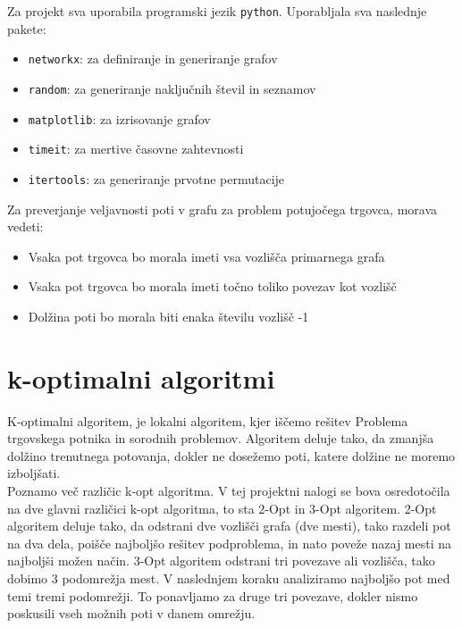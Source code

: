 \documentclass[12pt, a4paper]{article}
\begin{document}
Za projekt sva uporabila programski jezik \texttt{python}. Uporabljala sva naslednje pakete:

\begin{itemize}

\item \texttt{networkx}: za definiranje in generiranje grafov

\item \texttt{random}: za generiranje naključnih števil in seznamov

\item \texttt{matplotlib}: za izrisovanje grafov

\item \texttt{timeit}: za mertive časovne zahtevnosti

\item \texttt{itertools}: za generiranje prvotne permutacije

\end{itemize}

Za preverjanje veljavnosti poti v grafu za problem potujočega trgovca, morava vedeti:

\begin{itemize}

\item Vsaka pot trgovca bo morala imeti vsa vozlišča primarnega grafa
\item Vsaka pot trgovca bo morala imeti točno toliko povezav kot vozlišč
\item Dolžina poti bo morala biti enaka številu vozlišč -1

\end{itemize}

\newpage
\section[k-optimalni algoritmi]{k-optimalni algoritmi}

K-optimalni algoritem, je lokalni algoritem, kjer iščemo rešitev Problema trgovskega potnika in sorodnih problemov. Algoritem deluje tako, da zmanjša dolžino trenutnega potovanja, dokler ne dosežemo poti, katere dolžine ne moremo izboljšati.\\

Poznamo več različic k-opt algoritma. V tej projektni nalogi se bova osredotočila na dve glavni različici k-opt algoritma, to sta 2-Opt in 3-Opt algoritem. 2-Opt algoritem deluje tako, da odstrani dve vozlišči grafa (dve mesti), tako razdeli pot na dva dela, poišče najboljšo rešitev podproblema, in nato poveže nazaj mesti na najboljši možen način. 3-Opt algoritem odstrani tri povezave ali vozlišča, tako dobimo 3 podomrežja mest. V naslednjem koraku analiziramo najboljšo pot med temi tremi podomrežji. To ponavljamo za druge tri povezave, dokler nismo poskusili vseh možnih poti v danem omrežju.
\end{document}
